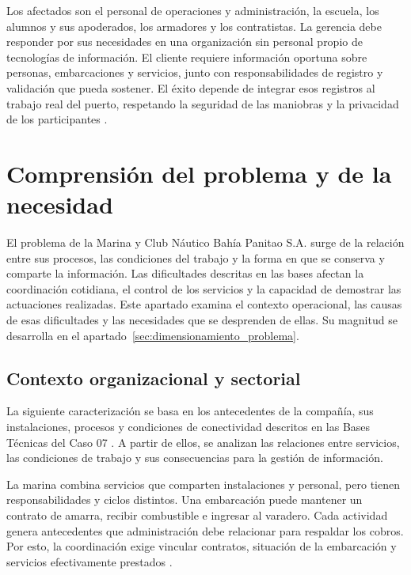 Los afectados son el personal de operaciones y administración, la escuela, los alumnos y sus apoderados, los armadores y los contratistas. La gerencia debe responder por sus necesidades en una organización sin personal propio de tecnologías de información. El cliente requiere información oportuna sobre personas, embarcaciones y servicios, junto con responsabilidades de registro y validación que pueda sostener. El éxito depende de integrar esos registros al trabajo real del puerto, respetando la seguridad de las maniobras y la privacidad de los participantes \parencite[cap.~2, secc.~2.4, pp.~7-8; cap.~10, p.~26]{pucv-caso07-2026}.

\newpage
\section{Comprensión del problema y de la necesidad} %
\label{sec:comprension_problema}

El problema de la Marina y Club Náutico Bahía Panitao S.A. surge de la relación entre sus procesos, las condiciones del trabajo y la forma en que se conserva y comparte la información. Las dificultades descritas en las bases afectan la coordinación cotidiana, el control de los servicios y la capacidad de demostrar las actuaciones realizadas. Este apartado examina el contexto operacional, las causas de esas dificultades y las necesidades que se desprenden de ellas. Su magnitud se desarrolla en el apartado~\ref{sec:dimensionamiento_problema}.

\subsection{Contexto organizacional y sectorial} %
La siguiente caracterización se basa en los antecedentes de la compañía, sus instalaciones, procesos y condiciones de conectividad descritos en las Bases Técnicas del Caso 07 \parencite[caps.~1-6, pp.~4-15]{pucv-caso07-2026}.
A partir de ellos, se analizan las relaciones entre servicios, las condiciones de trabajo y sus consecuencias para la gestión de información.

La marina combina servicios que comparten instalaciones y personal, pero tienen responsabilidades y ciclos distintos. Una embarcación puede mantener un contrato de amarra, recibir combustible e ingresar al varadero. Cada actividad genera antecedentes que administración debe relacionar para respaldar los cobros. Por esto, la coordinación exige vincular contratos, situación de la embarcación y servicios efectivamente prestados \parencite[cap.~4, pp.~9-13]{pucv-caso07-2026}.

